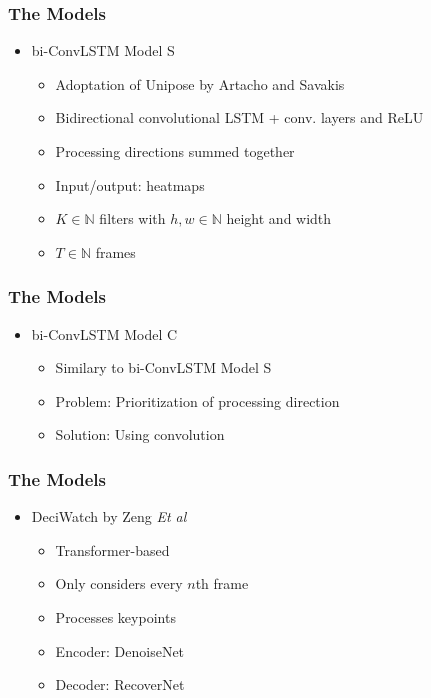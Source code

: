 \documentclass{beamer}
\begin{document}
\begin{frame}
    \frametitle{The Models}
    \begin{itemize}
        \item<1-> bi-ConvLSTM Model S
        \begin{itemize}
            \item<1-> Adoptation of Unipose by Artacho and Savakis
            \item<1-> Bidirectional convolutional LSTM + conv. layers and ReLU
            \item<1-> Processing directions summed together
            \item<2-> Input/output: heatmaps
            \item<2-> $K \in \mathbb{N}$ filters with $h, w \in \mathbb{N}$ height and width
            \item<2-> $T \in \mathbb{N}$ frames
        \end{itemize}
    \end{itemize}
\end{frame}

\begin{frame}
    \frametitle{The Models}
    \begin{itemize}
        \item<1-> bi-ConvLSTM Model C
        \begin{itemize}
            \item<1-> Similary to bi-ConvLSTM Model S
            \item<1-> Problem: Prioritization of processing direction
            \item<2-> Solution: Using convolution
        \end{itemize}
    \end{itemize}
\end{frame}

\begin{frame}
    \frametitle{The Models}
    \begin{itemize}
        \item<1-> DeciWatch by Zeng \textit{Et al}
        \begin{itemize}
            \item<1-> Transformer-based
            \item<1-> Only considers every $n$th frame
            \item<1-> Processes keypoints
            \item<2-> Encoder: DenoiseNet
            \item<2-> Decoder: RecoverNet
        \end{itemize}
    \end{itemize}
\end{frame}
\end{document}

